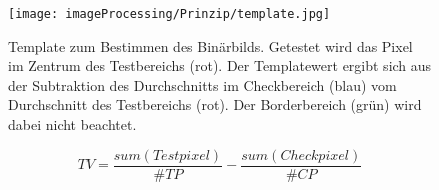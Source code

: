 
\begin{figure}[H]
\centering
\texttt{[image: imageProcessing/Prinzip/template.jpg]}
\caption[Template zum Bestimmen des Binärbilds]{Template zum Bestimmen des Binärbilds. Getestet wird das Pixel im Zentrum des Testbereichs (rot). Der Templatewert ergibt sich aus der Subtraktion des Durchschnitts im Checkbereich (blau) vom Durchschnitt des Testbereichs (rot). Der Borderbereich (grün) wird dabei nicht beachtet.}
\label{templImg}
\end{figure}

\begin{ownequation}[H]
\begin{equation}
TV = \frac{sum(Testpixel)}{\#TP} - \frac{sum(Checkpixel)}{\#CP}
\end{equation}
\caption[Templatewertberechnung für ein Pixel als Formelausdruck]{Templatewertberechnung für ein Pixel als Formelausdruck.Der berechnete Wert $TV$ ist der Unterschied zwischen Test- und Checkbereich.$\#TP$ bezeichnet die Anzahl der Testpixel und $\#CP$ die Anzahl der Checkpixel.}
\label{templateValue}
\end{ownequation}

